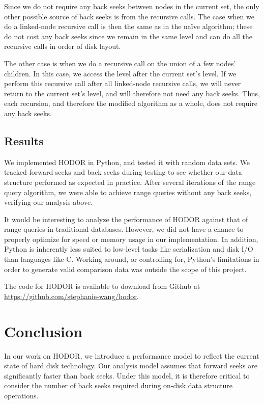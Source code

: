 \documentclass[11pt, oneside]{article}
\begin{document}
Since we do not require any back seeks between nodes in the current set, the
only other possible source of back seeks is from the recursive calls.  The case
when we do a linked-node recursive call is then the same as in the na{\"i}ve
algorithm; these do not cost any back seeks since we remain in the same level
and can do all the recursive calls in order of disk layout. 

The other case is when we do a recursive call on the union of a few nodes'
children. In this case, we access the level after the current set's level. If we
perform this recursive call after all linked-node recursive calls, we will never
return to the current set's level, and will therefore not need any back seeks.
Thus, each recursion, and therefore the modified algorithm as a whole, does not
require any back seeks.

\subsection{Results}

We implemented HODOR in Python, and tested it with random data sets. We tracked
forward seeks and back seeks during testing to see whether our data structure
performed as expected in practice. After several iterations of the range query
algorithm, we were able to achieve range queries without any back seeks,
verifying our analysis above. 

It would be interesting to analyze the performance of HODOR against that of
range queries in traditional databases. However, we did not have a chance to
properly optimize for speed or memory usage in our implementation. In addition,
Python is inherently less suited to low-level tasks like serialization and
disk I/O than languages like C. Working around, or controlling for, Python's
limitations in order to generate valid comparison data was outside the scope of
this project. 

The code for HODOR is available to download from Github at
\url{https://github.com/stephanie-wang/hodor}.

\section{Conclusion}

In our work on HODOR, we introduce a performance model to reflect the current
state of hard disk technology.  Our analysis model assumes that forward seeks
are significantly faster than back seeks. Under this model, it is therefore
critical to consider the number of back seeks required during on-disk data
structure operations. 
\end{document}
